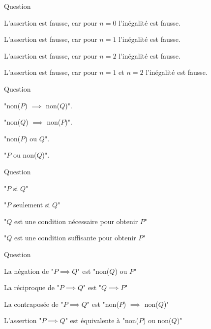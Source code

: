 \begin{multi}[multiple,feedback=
{C'est faux pour \(n=1\) et \(n=2\), mais bien sûr, un seul cas suffit pour que l'assertion soit fausse. 
}]{Question}
    \item L'assertion est fausse, car pour \(n=0\) l'inégalité est fausse.
    \item* L'assertion est fausse, car pour \(n=1\) l'inégalité est fausse.
    \item* L'assertion est fausse, car pour \(n=2\) l'inégalité est fausse.
    \item* L'assertion est fausse, car pour \(n=1\) et \(n=2\) l'inégalité est fausse.
\end{multi}


\begin{multi}[multiple,feedback=
{La contraposée de "\(P \implies Q\)" est "non(\(Q\)) \(\implies\) non(\(P\))".
}]{Question}
    \item "non(\(P\)) \(\implies\) non(\(Q\))".
    \item* "non(\(Q\)) \(\implies\) non(\(P\))".
    \item "non(\(P\)) ou \(Q\)".
    \item "\(P\) ou non(\(Q\))".
\end{multi}


\begin{multi}[multiple,feedback=
{C'est plus facile si on comprend que "\(P \Longleftarrow Q\)", c'est "\(Q \implies P\)", autrement dit "si \(Q\) est vraie, alors \(P\) est vraie".
}]{Question}
    \item* "\(P\) si \(Q\)"
    \item "\(P\) seulement si \(Q\)"
    \item "\(Q\) est une condition nécessaire pour obtenir \(P\)"
    \item* "\(Q\) est une condition suffisante pour obtenir \(P\)"
\end{multi}


\begin{multi}[multiple,feedback=
{Il faut revenir à la définition de "\(P \implies Q\)" qui est "non(\(P\)) ou \(Q\)".
}]{Question}
    \item La négation de "\(P \implies Q\)" est "non(\(Q\)) ou \(P\)"
    \item* La réciproque de "\(P \implies Q\)" est "\(Q \implies P\)"
    \item La contraposée de "\(P \implies Q\)" est "non(\(P\)) \(\implies\) non(\(Q\))"
    \item L'assertion "\(P \implies Q\)" est équivalente à "non(\(P\)) ou non(\(Q\))"
\end{multi}


